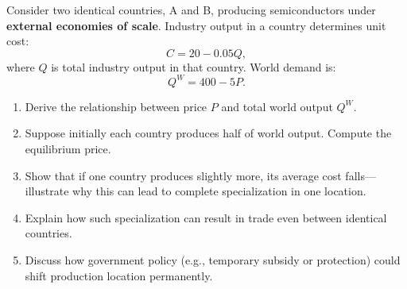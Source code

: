\documentclass[12pt]{article}
\begin{document}
Consider two identical countries, A and B, producing semiconductors under \textbf{external economies of scale}.  
Industry output in a country determines unit cost:
\[
C = 20 - 0.05Q,
\]
where \( Q \) is total industry output in that country.  
World demand is:
\[
Q^W = 400 - 5P.
\]

\begin{enumerate}[label=(\alph*)]
\item Derive the relationship between price \( P \) and total world output \( Q^W \).  
\item Suppose initially each country produces half of world output. Compute the equilibrium price.  
\item Show that if one country produces slightly more, its average cost falls—illustrate why this can lead to complete specialization in one location.  
\item Explain how such specialization can result in trade even between identical countries.  
\item Discuss how government policy (e.g., temporary subsidy or protection) could shift production location permanently.  
\end{enumerate}
\end{document}
